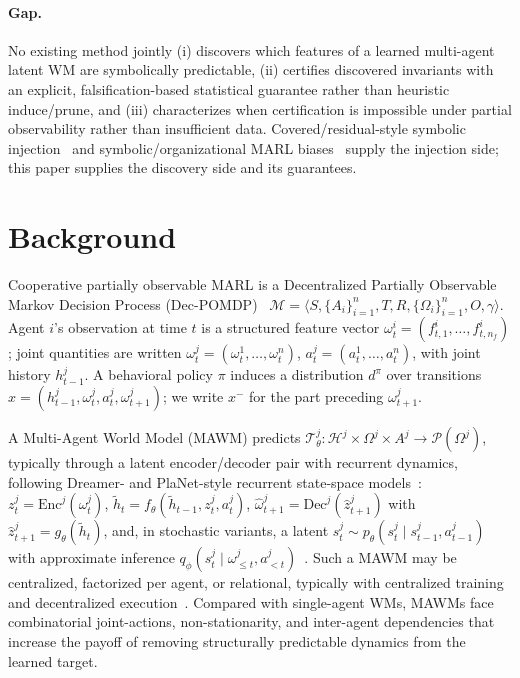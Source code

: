 \documentclass[letterpaper]{article} %
\theoremstyle{plain}
\theoremstyle{definition}
\theoremstyle{remark}
\begin{document}
\paragraph{Gap.} No existing method jointly (i) discovers which features of a learned multi-agent latent WM are symbolically predictable, (ii) certifies discovered invariants with an explicit, falsification-based statistical guarantee rather than heuristic induce/prune, and (iii) characterizes when certification is impossible under partial observability rather than insufficient data. Covered/residual-style symbolic injection~\cite{balloch2023neurosymbolicworldmodelsadapting} and symbolic/organizational MARL biases~\cite{hasanbeig2018lcrl,soule2025moisemarl,alshiekh2018shield} supply the injection side; this paper supplies the discovery side and its guarantees.

\section{Background}
\label{sec:background}

Cooperative partially observable MARL is a Decentralized Partially Observable Markov Decision Process (Dec-POMDP)~\cite{oliehoek2016concise,Bernstein2000complexity} $\mathcal{M} = \langle S, \{A_i\}_{i=1}^n, T, R, \{\Omega_i\}_{i=1}^n, O, \gamma \rangle$. Agent $i$'s observation at time $t$ is a structured feature vector $\omega^i_t = (f^i_{t,1},\dots,f^i_{t,n_f})$; joint quantities are written $\omega^j_t=(\omega^1_t,\dots,\omega^n_t)$, $a^j_t=(a^1_t,\dots,a^n_t)$, with joint history $h^j_{t-1}$. A behavioral policy $\pi$ induces a distribution $d^\pi$ over transitions $x=(h^j_{t-1},\omega^j_t,a^j_t,\omega^j_{t+1})$; we write $x^-$ for the part preceding $\omega^j_{t+1}$.

A Multi-Agent World Model (MAWM) predicts $\mathcal{T}^j_\theta: \mathcal{H}^j\times\Omega^j\times A^j\to\mathcal{P}(\Omega^j)$, typically through a latent encoder/decoder pair with recurrent dynamics, following Dreamer- and PlaNet-style recurrent state-space models~\cite{hafner2018planet,hafner2019dreamer,ha2018worldmodels}: $z^j_t = \mathrm{Enc}^j(\omega^j_t)$, $\tilde h_t = f_\theta(\tilde h_{t-1}, z^j_t, a^j_t)$, $\hat\omega^j_{t+1} = \mathrm{Dec}^j(\hat z^j_{t+1})$ with $\hat z^j_{t+1}=g_\theta(\tilde h_t)$, and, in stochastic variants, a latent $s^j_t\sim p_\theta(s^j_t\mid s^j_{t-1},a^j_{t-1})$ with approximate inference $q_\phi(s^j_t\mid\omega^j_{\le t},a^j_{<t})$~\cite{hafner2020dreamerv2}. Such a MAWM may be centralized, factorized per agent, or relational, typically with centralized training and decentralized execution~\cite{oliehoek2016concise,marl-book,wang2022}. Compared with single-agent WMs, MAWMs face combinatorial joint-actions, non-stationarity, and inter-agent dependencies that increase the payoff of removing structurally predictable dynamics from the learned target.
\end{document}
